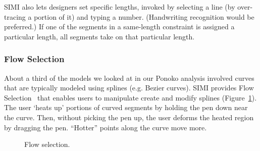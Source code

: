 \documentclass{article}
\begin{document}
SIMI also lets designers set specific lengths, invoked by selecting a
line (by over-tracing a portion of it) and typing a
number. (Handwriting recognition would be preferred.) If one of the
segments in a same-length constraint is assigned a particular length,
all segments take on that particular length.

\subsubsection{Flow Selection}


About a third of the models we looked at in our Ponoko analysis
involved curves that are typically modeled using splines (e.g. Bezier
curves). SIMI provides Flow Selection~\cite{johnson-flow-selection}
that enables users to manipulate create and modify splines
(Figure~\ref{fig:fs}). The user `heats up' portions of curved segments
by holding the pen down near the curve. Then, without picking the pen
up, the user deforms the heated region by dragging the pen. ``Hotter''
points along the curve move more.

\begin{figure}[h]
\centering {}
\hspace{3mm} 
\caption{Flow selection.}
\label{fig:fs}
\end{figure}
\end{document}
